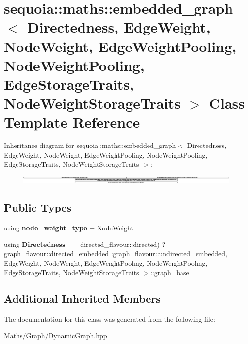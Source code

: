 \hypertarget{classsequoia_1_1maths_1_1embedded__graph}{}\section{sequoia\+::maths\+::embedded\+\_\+graph$<$ Directedness, Edge\+Weight, Node\+Weight, Edge\+Weight\+Pooling, Node\+Weight\+Pooling, Edge\+Storage\+Traits, Node\+Weight\+Storage\+Traits $>$ Class Template Reference}
\label{classsequoia_1_1maths_1_1embedded__graph}
Inheritance diagram for sequoia\+::maths\+::embedded\+\_\+graph$<$ Directedness, Edge\+Weight, Node\+Weight, Edge\+Weight\+Pooling, Node\+Weight\+Pooling, Edge\+Storage\+Traits, Node\+Weight\+Storage\+Traits $>$\+:\begin{figure}[H]
\begin{center}
\leavevmode
\includegraphics[height=0.428135cm]{classsequoia_1_1maths_1_1embedded__graph}
\end{center}
\end{figure}
\subsection*{Public Types}
\begin{DoxyCompactItemize}
\item 
\mbox{\label{classsequoia_1_1maths_1_1embedded__graph_a5e850aff5b4f613eaf4724af9c543495}} 
using {\bfseries node\+\_\+weight\+\_\+type} = Node\+Weight
\item 
\mbox{\label{classsequoia_1_1maths_1_1embedded__graph_a55d62890614527f45645b4a0055c9a3f}} 
using {\bfseries Directedness} = =directed\+\_\+flavour\+::directed) ? graph\+\_\+flavour\+::directed\+\_\+embedded \+:graph\+\_\+flavour\+::undirected\+\_\+embedded, Edge\+Weight, Node\+Weight, Edge\+Weight\+Pooling, Node\+Weight\+Pooling, Edge\+Storage\+Traits, Node\+Weight\+Storage\+Traits $>$\+::\mbox{\hyperlink{classsequoia_1_1maths_1_1graph__base}{graph\+\_\+base}}
\end{DoxyCompactItemize}
\subsection*{Additional Inherited Members}


The documentation for this class was generated from the following file\+:\begin{DoxyCompactItemize}
\item 
Maths/\+Graph/\mbox{\hyperlink{_dynamic_graph_8hpp}{Dynamic\+Graph.\+hpp}}\end{DoxyCompactItemize}

